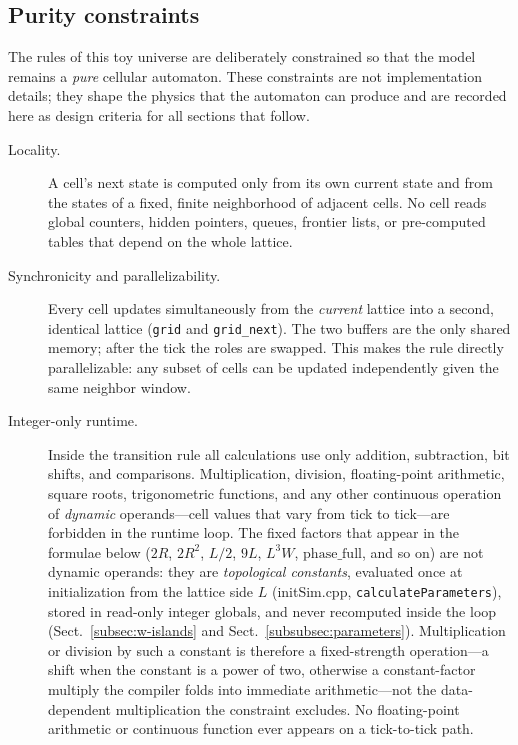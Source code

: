 \documentclass{ijuc}
\begin{document}
\subsection{Purity constraints\label{subsec:purity}}

The rules of this toy universe are deliberately constrained so that the model remains a \emph{pure} cellular automaton.  These constraints are not implementation details; they shape the physics that the automaton can produce and are recorded here as design criteria for all sections that follow.

\begin{description}
    \item[Locality.]  A cell's next state is computed only from its own current state and from the states of a fixed, finite neighborhood of adjacent cells.  No cell reads global counters, hidden pointers, queues, frontier lists, or pre-computed tables that depend on the whole lattice.
    \item[Synchronicity and parallelizability.]  Every cell updates simultaneously from the \emph{current} lattice into a second, identical lattice (\texttt{grid} and \texttt{grid\_next}).  The two buffers are the only shared memory; after the tick the roles are swapped.  This makes the rule directly parallelizable: any subset of cells can be updated independently given the same neighbor window.
    \item[Integer-only runtime.]  Inside the transition rule all calculations use only addition, subtraction, bit shifts, and comparisons.  Multiplication, division, floating-point arithmetic, square roots, trigonometric functions, and any other continuous operation of \emph{dynamic} operands---cell values that vary from tick to tick---are forbidden in the runtime loop.  The fixed factors that appear in the formulae below ($2R$, $2R^{2}$, $L/2$, $9L$, $L^{3}W$, $\mathrm{phase\_full}$, and so on) are not dynamic operands: they are \emph{topological constants}, evaluated once at initialization from the lattice side $L$ (initSim.cpp, \texttt{calculateParameters}), stored in read-only integer globals, and never recomputed inside the loop (Sect.~\ref{subsec:w-islands} and Sect.~\ref{subsubsec:parameters}).  Multiplication or division by such a constant is therefore a fixed-strength operation---a shift when the constant is a power of two, otherwise a constant-factor multiply the compiler folds into immediate arithmetic---not the data-dependent multiplication the constraint excludes.  No floating-point arithmetic or continuous function ever appears on a tick-to-tick path.

\end{description}
\end{document}
